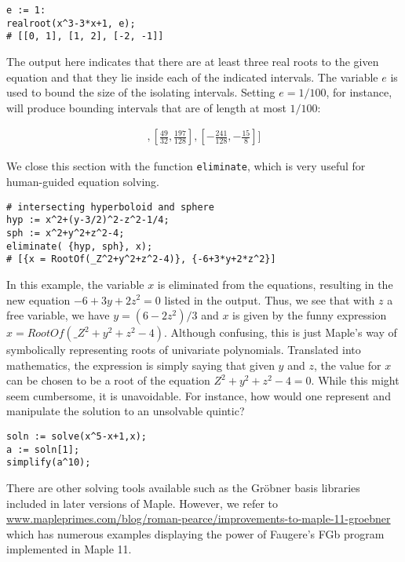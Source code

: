 \documentclass[12pt]{amsart}
\begin{document}
\begin{verbatim}
e := 1:
realroot(x^3-3*x+1, e);
# [[0, 1], [1, 2], [-2, -1]]
\end{verbatim}

The output here indicates that there are at least three real roots to the given equation and that
they lie inside each of the indicated intervals.  The variable $e$ is used to
bound the size of the isolating intervals.  Setting $e = 1/100$, for instance, will produce bounding intervals
that are of length at most $1/100$:

\begin{align*}
[[{\frac {11}{32}},{\frac {45}{128}}],[{\frac {49}{32}},{\frac {197}{
128}}],[-{\frac {241}{128}},-{\frac {15}{8}}]]
\end{align*}

We close this section with the function \texttt{eliminate}, which is very useful
for human-guided equation solving.

\begin{verbatim}
# intersecting hyperboloid and sphere
hyp := x^2+(y-3/2)^2-z^2-1/4;
sph := x^2+y^2+z^2-4;
eliminate( {hyp, sph}, x);
# [{x = RootOf(_Z^2+y^2+z^2-4)}, {-6+3*y+2*z^2}]
\end{verbatim}

In this example, the variable $x$ is eliminated from the equations, resulting in the new
equation $-6+3y+2z^2 = 0$ listed in the output.  Thus, we see that with $z$ a free variable, we
have $y = (6-2z^2)/3$ and $x$ is given by the funny expression $x = RootOf(\_Z^2+y^2+z^2-4)$.
Although confusing, this is just Maple's way of symbolically representing roots of univariate
polynomials.  Translated into mathematics, the expression is simply saying that given $y$ and $z$,
the value for $x$ can be chosen to be a root of the equation $Z^2 + y^2+z^2-4 = 0$.  While this
might seem cumbersome, it is unavoidable.  For instance, how would one represent and manipulate
the solution to an unsolvable quintic?

\begin{verbatim}
soln := solve(x^5-x+1,x);
a := soln[1]; 
simplify(a^10);
\end{verbatim}

There are other solving tools available such as the Gr\"obner basis libraries 
included in later versions of Maple.  However, we refer to 
\url{www.mapleprimes.com/blog/roman-pearce/improvements-to-maple-11-groebner}
which has numerous examples displaying the power of Faugere's FGb program implemented
in Maple 11.
\end{document}
